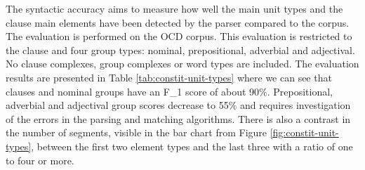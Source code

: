 \begin{table}[!ht]
    \caption{The evaluation statistics for the main constituency unit types}
    \label{tab:constit-unit-types}
\end{table}

    The syntactic accuracy aims to measure how well the main unit types and the clause main elements have been detected by the parser compared to the corpus. The evaluation is performed on the OCD corpus. This evaluation is restricted to the clause and four group types: nominal, prepositional, adverbial and adjectival. No clause complexes, group complexes or word types are included. The evaluation results are presented in Table \ref{tab:constit-unit-types} where we can see that clauses and nominal groups have an F_1 score of about 90\%. Prepositional, adverbial and adjectival group scores decrease to 55\% and requires investigation of the errors in the parsing and matching algorithms. There is also a contrast in the number of segments, visible in the bar chart from Figure \ref{fig:constit-unit-types}, between the first two element types and the last three with a ratio of one to four or more.

